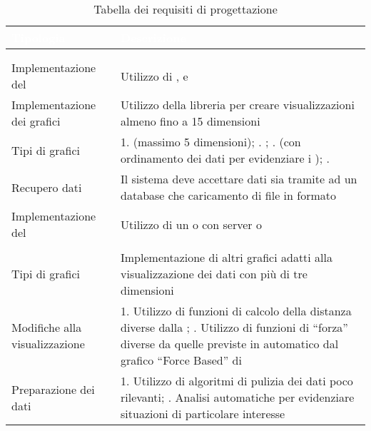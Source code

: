 \renewcommand{\arraystretch}{1.5}
\begin{longtable}{C{4cm} | C{11.5cm}}
		\textcolor{white}{\textbf{Tipologia}} & 
		\textcolor{white}{\textbf{Descrizione}} \\
		\endfirsthead
	    \\
	    \endfoot
	    \caption{Tabella dei requisiti di progettazione}
	    \endlastfoot

\\	    
	    
Implementazione del  & Utilizzo di ,  e \\

Implementazione dei grafici & Utilizzo della libreria  per creare visualizzazioni almeno fino a 15 dimensioni\\

Tipi di grafici & 
1.  (massimo 5 dimensioni);
.   ;
.  (con ordinamento dei dati per evidenziare i );
.  
\\

Recupero dati & Il sistema deve accettare dati sia tramite  ad un database che caricamento di file in formato  \\

Implementazione del  & Utilizzo di un   o  con server  o  \\
	    
\\	

Tipi di grafici & Implementazione di altri grafici adatti alla visualizzazione dei dati con più di tre dimensioni \\

Modifiche alla visualizzazione & 1. Utilizzo di funzioni di calcolo della distanza diverse dalla ; . Utilizzo di funzioni di “forza” diverse da quelle previste in automatico dal grafico “Force Based” di  \\

Preparazione dei dati & 1. Utilizzo di algoritmi di pulizia dei dati poco rilevanti; . Analisi automatiche per evidenziare situazioni di particolare interesse\\

\end{longtable}



